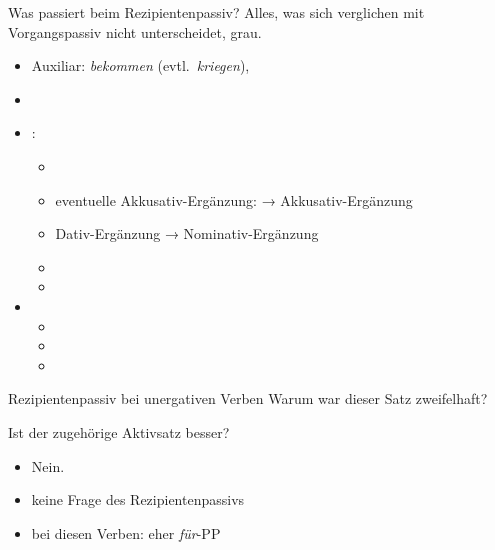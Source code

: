\begin{frame}
  {Was passiert beim Rezipientenpassiv?}
  \pause
  Alles, was sich verglichen mit Vorgangspassiv nicht unterscheidet, grau.\\
  \Halbzeile
  \pause
  \begin{itemize}[<+->]
    \item Auxiliar: \textit{bekommen} (evtl.\ \textit{kriegen}), 
    \item {}
      \Halbzeile
    \item {}:
      \begin{itemize}[<+->]
        \item {}
        \item eventuelle Akkusativ-Ergänzung: → Akkusativ-Ergänzung
        \item \alert{Dativ-Ergänzung → Nominativ-Ergänzung}
        \item {}
        \item {}
      \end{itemize}
    \Halbzeile
  \item {}
    \begin{itemize}[<+->]
      \item {}
      \item {}
      \item {}
    \end{itemize}
  \end{itemize}
\end{frame}

\begin{frame}
  {Rezipientenpassiv bei unergativen Verben}
  \pause
  Warum war dieser Satz zweifelhaft?\\
  \begin{exe}
  \end{exe}
  \pause
  \Halbzeile
  Ist der zugehörige Aktivsatz besser?\\
  \pause
  \begin{exe}
  \end{exe}
  \pause
  \begin{itemize}[<+->]
    \item Nein.
    \item \alert{keine Frage des Rezipientenpassivs}
    \item bei diesen Verben: eher \textit{für}-PP
  \end{itemize}
\end{frame}


